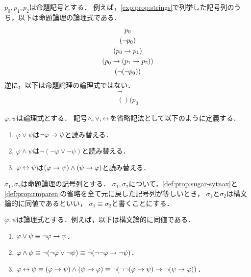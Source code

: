 \begin{myExample}[命題論理の論理式の例]
  $p_0,p_1,p_2$は命題記号とする．
  例えば，\ref{exp:prop:strings}で列挙した記号列のうち，以下は命題論理の論理式である．
  \begin{gather*}
    p_0 \\
    (\neg p_0) \\
    (p_0 \to p_1) \\
    (p_0 \to (p_1 \to p_2)) \\
    (\lnot(\lnot p_0))
  \end{gather*}
  逆に，以下は命題論理の論理式ではない．
  \begin{gather*}
    \neg \\
    ()(p_0
  \end{gather*}
\end{myExample}

\begin{myDefinition}
  \label{def:prop:sugar-sytnax}
  $\varphi, \psi$は論理式とする．
  記号$\land, \lor, \leftrightarrow$を省略記法として以下のように定義する．
  \begin{enumerate}
    \item $\varphi \lor \psi$は$\lnot\varphi \to \psi$と読み替える．
    \item $\varphi \land \psi$は$\lnot(\lnot\varphi \lor \lnot\psi)$と読み替える．
    \item $\varphi \leftrightarrow \psi$は$(\varphi \to \psi) \land (\psi \to \varphi)$と読み替える．
  \end{enumerate}
\end{myDefinition}

\begin{myDefinition}[括弧の省略]
  \label{def:prop:rmparen}
\end{myDefinition}

\begin{myDefinition}[構文論的同値]
  $\sigma_1,\sigma_2$は命題論理の記号列とする．
  $\sigma_1,\sigma_2$について，\ref*{def:prop:sugar-sytnax}と\ref*{def:prop:rmparen}の省略を全て元に戻した記号列が等しいとき，
  $\sigma_1$と$\sigma_2$は構文論的に同値であるといい，
  $\sigma_1 \equiv \sigma_2$と書くことにする．
\end{myDefinition}

\begin{myExample}[構文論的同値の例]
  \label{exp:prop:syntax-equiv}
  $\varphi, \psi$は論理式とする．例えば，以下は構文論的に同値である．
  \begin{enumerate}
    \item $\varphi \lor \psi \equiv \lnot\varphi \to \psi$．
    \item $\varphi \land \psi \equiv \lnot(\lnot\varphi \lor \lnot\psi) \equiv \lnot(\lnot\lnot\varphi \to \lnot\psi)$．
    \item $\varphi \leftrightarrow \psi \equiv (\varphi \to \psi) \land (\psi \to \varphi) \equiv \lnot(\lnot\lnot(\varphi \to \psi) \to \lnot(\psi \to \varphi))$．
  \end{enumerate}
\end{myExample}

